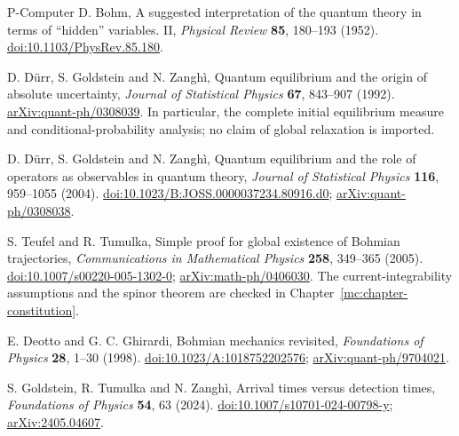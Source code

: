 \documentclass[11pt,oneside,openany]{book}
\theoremstyle{definition}
\theoremstyle{remark}\newtheorem{remark}[theorem]{Remark}
\begin{document}
\begin{thebibliography}{P-Computer}
D. Bohm,
A suggested interpretation of the quantum theory in terms of ``hidden'' variables. II,
\emph{Physical Review} \textbf{85}, 180--193 (1952).
\href{https://doi.org/10.1103/PhysRev.85.180}{doi:10.1103/PhysRev.85.180}.

D. D\"urr, S. Goldstein and N. Zangh\`i,
Quantum equilibrium and the origin of absolute uncertainty,
\emph{Journal of Statistical Physics} \textbf{67}, 843--907 (1992).
\href{https://arxiv.org/abs/quant-ph/0308039}{arXiv:quant-ph/0308039}.
In particular, the complete initial equilibrium measure and conditional-probability analysis;
no claim of global relaxation is imported.

D. D\"urr, S. Goldstein and N. Zangh\`i,
Quantum equilibrium and the role of operators as observables in quantum theory,
\emph{Journal of Statistical Physics} \textbf{116}, 959--1055 (2004).
\href{https://doi.org/10.1023/B:JOSS.0000037234.80916.d0}{doi:10.1023/B:JOSS.0000037234.80916.d0};
\href{https://arxiv.org/abs/quant-ph/0308038}{arXiv:quant-ph/0308038}.

S. Teufel and R. Tumulka,
Simple proof for global existence of Bohmian trajectories,
\emph{Communications in Mathematical Physics} \textbf{258}, 349--365 (2005).
\href{https://doi.org/10.1007/s00220-005-1302-0}{doi:10.1007/s00220-005-1302-0};
\href{https://arxiv.org/abs/math-ph/0406030}{arXiv:math-ph/0406030}.
The current-integrability assumptions and the spinor theorem are checked in
Chapter~\ref{mc:chapter-constitution}.

E. Deotto and G. C. Ghirardi,
Bohmian mechanics revisited,
\emph{Foundations of Physics} \textbf{28}, 1--30 (1998).
\href{https://doi.org/10.1023/A:1018752202576}{doi:10.1023/A:1018752202576};
\href{https://arxiv.org/abs/quant-ph/9704021}{arXiv:quant-ph/9704021}.

S. Goldstein, R. Tumulka and N. Zangh\`i,
Arrival times versus detection times,
\emph{Foundations of Physics} \textbf{54}, 63 (2024).
\href{https://doi.org/10.1007/s10701-024-00798-y}{doi:10.1007/s10701-024-00798-y};
\href{https://arxiv.org/abs/2405.04607}{arXiv:2405.04607}.

\end{thebibliography}

\end{document}
